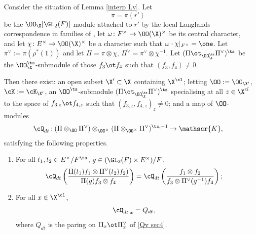 \begin{prop}
\notready \label{interp QcircS}
Consider the situation of Lemma \ref{interp Lv}. Let
$$\pi=\pi(r')$$
 be the $\OO_{\X}[\GL_{2}(F)]$-module attached to $r'$  by   the local Langlands   correspondence in  families of \cite{LLC}, let $\omega\colon F^{\times}\to \OO(\X)^{\times}$ be its central character, and  let $\chi\colon E^{\times}\to \OO(\X)^{\times}$ be a  character  such that $\omega\cdot \chi|_{F^{\times}}=\one$.
Let $\pi^{\vee}:=\pi(\rho^{*}(1))$ and let $\Pi=\pi \otimes \chi$, $\Pi^{\vee}=\pi^{\vee}\otimes \chi^{-1}$.
Let $(\Pi\ot_{\OO_{\X}^{\ts}}\Pi^{\vee})^{\ts}$ be the $\OO_{\X}^{\ts}$-submodule of those $f_{3}\ot f_{4}$ such that $(f_{3}, f_{4})\neq 0$.

 Then there exist: an open subset $\X'\subset \X$ containing $\X^{\cl}$; letting  $\OO:=\OO_{\X'}$, $\cK:=\cK_{\X'} $, an $\OO^{\ts}$-submodule
  $(\Pi\ot_{\OO_{\X}^{\ts}}\Pi^{\vee})^{\ts}$ specialising at all $z\in \X^{cl}$ to the space of $f_{3,z}\ot f_{4,z}$ such that $(f_{3, z}, f_{4, z})_{z}\neq 0$;  and  a map of $\OO$-modules
$$\cQ_{dt}^{} \colon
(\Pi\otimes_{\OO}\Pi^{\vee})\otimes_{\OO^{\times}}  ({\Pi} \otimes_{\OO^{\times}} {\Pi}^{\vee})^{\ts, -1}
 \to \mathscr{K},$$
satisfying the following properties.
\begin{enumerate}\item
For all $t_{1}, t_{2}\in E^{\times}/F^{\ts}$, $g\in (\GL_{2}(F)\times E^{\times})/F^{}$,
$$\cQ_{dt}\left({ \Pi(t_{1})f_{1}\otimes \Pi^{\vee}(t_{2})f_{2})\over \Pi( g)f_{3}\otimes f_{4}}\right)=
\cQ_{dt}\left(
{f_{1}\otimes f_{2}\over  f_{3}\otimes \Pi^{\vee}(g^{-1})f_{4}}\right);$$
\item For all $x\in \X^{\cl}$,
$$\cQ^{}_{dt | x} =Q_{dt}, $$ where $Q_{dt}$ is  the paring on $\Pi_{x}\ot \Pi_{x}^{\vee}$ of   \eqref{Qv sec4}.
\end{enumerate}
\end{prop}
